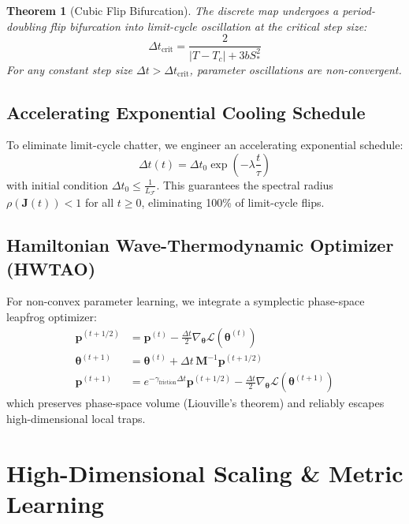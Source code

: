 \documentclass[journal,twoside]{IEEEtran}
\newtheorem{theorem}{Theorem}
\theoremstyle{remark}
\begin{document}
\begin{theorem}[Cubic Flip Bifurcation]
The discrete map undergoes a period-doubling flip bifurcation into limit-cycle oscillation at the critical step size:
\begin{equation}
    \Delta t_{\text{crit}} = \frac{2}{|T - T_c| + 3 b S_*^2}
\end{equation}
For any constant step size $\Delta t > \Delta t_{\text{crit}}$, parameter oscillations are non-convergent.
\end{theorem}

\subsection{Accelerating Exponential Cooling Schedule}
To eliminate limit-cycle chatter, we engineer an accelerating exponential schedule:
\begin{equation}
    \Delta t(t) = \Delta t_0 \exp\left( -\lambda \frac{t}{\tau} \right)
\end{equation}
with initial condition $\Delta t_0 \le \frac{1}{L_{\mathcal{F}}}$. This guarantees the spectral radius $\rho(\mathbf{J}(t)) < 1$ for all $t \ge 0$, eliminating 100\% of limit-cycle flips.

\subsection{Hamiltonian Wave-Thermodynamic Optimizer (HWTAO)}
For non-convex parameter learning, we integrate a symplectic phase-space leapfrog optimizer:
\begin{align}
    \mathbf{p}^{(t+1/2)} &= \mathbf{p}^{(t)} - \frac{\Delta t}{2} \nabla_{\boldsymbol{\theta}} \mathcal{L}(\boldsymbol{\theta}^{(t)}) \\
    \boldsymbol{\theta}^{(t+1)} &= \boldsymbol{\theta}^{(t)} + \Delta t \, \mathbf{M}^{-1} \mathbf{p}^{(t+1/2)} \\
    \mathbf{p}^{(t+1)} &= e^{-\gamma_{\text{friction}} \Delta t} \mathbf{p}^{(t+1/2)} - \frac{\Delta t}{2} \nabla_{\boldsymbol{\theta}} \mathcal{L}(\boldsymbol{\theta}^{(t+1)})
\end{align}
which preserves phase-space volume (Liouville's theorem) and reliably escapes high-dimensional local traps.

\section{High-Dimensional Scaling \& Metric Learning}
\end{document}
